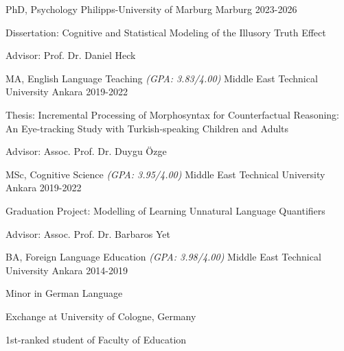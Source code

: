 

\begin{cventries}

    \cventry
    {PhD, Psychology} %
    {Philipps-University of Marburg} %
    {Marburg} %
    {2023-2026} %
    {
      \begin{cvitems} %
        \item {Dissertation: Cognitive and Statistical Modeling of the Illusory Truth Effect}
        \item {Advisor: Prof. Dr. Daniel Heck}
      \end{cvitems}
    }


  \cventry
    {MA, English Language Teaching \textit{(GPA: 3.83/4.00)}} %
    {Middle East Technical University} %
    {Ankara} %
    {2019-2022} %
    {
      \begin{cvitems} %
        \item {Thesis: Incremental Processing of Morphosyntax for Counterfactual Reasoning:\\
        An Eye-tracking Study with Turkish-speaking Children and Adults}
        \item {Advisor: Assoc. Prof. Dr. Duygu Özge}
      \end{cvitems}
    }

  \cventry
    {MSc, Cognitive Science \textit{(GPA: 3.95/4.00)}} %
    {Middle East Technical University} %
    {Ankara} %
    {2019-2022} %
    {
      \begin{cvitems} %
        \item {Graduation Project: Modelling of Learning Unnatural Language Quantifiers}
        \item {Advisor: Assoc. Prof. Dr. Barbaros Yet}
      \end{cvitems}
    }

  \cventry
    {BA, Foreign Language Education \textit{(GPA: 3.98/4.00)}} %
    {Middle East Technical University} %
    {Ankara} %
    {2014-2019} %
    {
      \begin{cvitems} %
        \item {Minor in German Language}
        \item {Exchange at University of Cologne, Germany}
        \item {1st-ranked student of Faculty of Education}
      \end{cvitems}
    }
\end{cventries}
